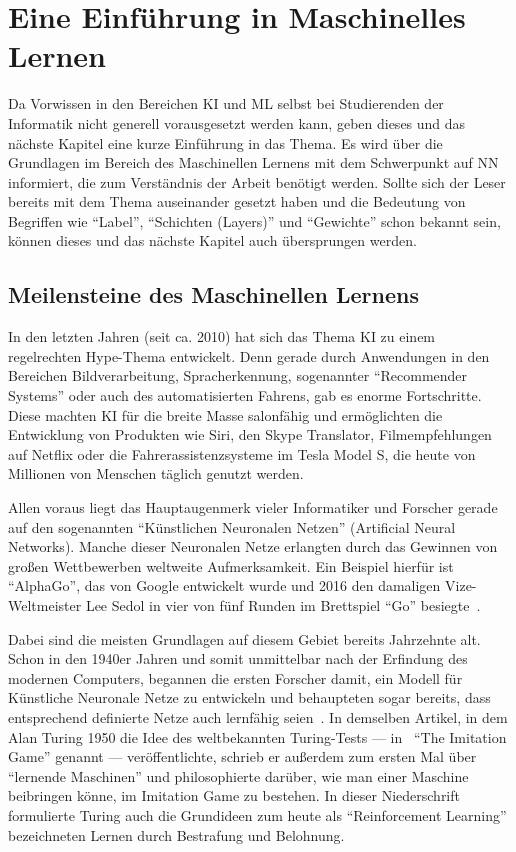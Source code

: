 \chapter{Eine Einführung in Maschinelles Lernen}
Da Vorwissen in den Bereichen \gls{KI} und \gls{ML} selbst bei Studierenden der Informatik nicht generell vorausgesetzt werden kann, geben dieses und das nächste Kapitel eine kurze Einführung in das Thema. Es wird über die Grundlagen im Bereich des Maschinellen Lernens mit dem Schwerpunkt auf \gls{NN} informiert, die zum Verständnis der Arbeit benötigt werden. Sollte sich der Leser bereits mit dem Thema auseinander gesetzt haben und die Bedeutung von Begriffen wie "`\gls{Label}"', "`Schichten (Layers)"' und "`Gewichte"' schon bekannt sein, können dieses und das nächste Kapitel auch übersprungen werden.

\section{Meilensteine des Maschinellen Lernens} \label{sec:milestones}
In den letzten Jahren (seit ca. 2010) hat sich das Thema \gls{KI} zu einem regelrechten Hype-Thema entwickelt. Denn gerade durch Anwendungen in den Bereichen Bildverarbeitung, Spracherkennung, sogenannter "`Recommender Systems"' oder auch des automatisierten Fahrens, gab es enorme Fortschritte. Diese machten \gls{KI} für die breite Masse salonfähig und ermöglichten die Entwicklung von Produkten wie Siri, den Skype Translator, Filmempfehlungen auf Netflix oder die Fahrerassistenzsysteme im Tesla Model S, die heute von Millionen von Menschen täglich genutzt werden.

Allen voraus liegt das Hauptaugenmerk vieler Informatiker und Forscher gerade auf den sogenannten "`Künstlichen Neuronalen Netzen"' (Artificial Neural Networks). Manche dieser Neuronalen Netze erlangten durch das Gewinnen von großen Wettbewerben weltweite Aufmerksamkeit. Ein Beispiel hierfür ist "`AlphaGo"', das von Google entwickelt wurde und 2016 den damaligen Vize-Weltmeister Lee Sedol in vier von fünf Runden im Brettspiel "`Go"' besiegte~\cite{alphaGo}.

Dabei sind die meisten Grundlagen auf diesem Gebiet bereits Jahrzehnte alt. Schon in den 1940er Jahren und somit unmittelbar nach der Erfindung des modernen Computers, begannen die ersten Forscher damit, ein Modell für Künstliche Neuronale Netze zu entwickeln und behaupteten sogar bereits, dass entsprechend definierte Netze auch lernfähig seien~\cite{Russell.2012}. In demselben Artikel, in dem Alan Turing 1950 die Idee des weltbekannten Turing-Tests --- in~\cite{TURING.1950} "`The Imitation Game"' genannt --- veröffentlichte, schrieb er außerdem zum ersten Mal über "`lernende Maschinen"' und philosophierte darüber, wie man einer Maschine beibringen könne, im Imitation Game zu bestehen. In dieser Niederschrift formulierte Turing auch die Grundideen zum heute als "`Reinforcement Learning"' bezeichneten Lernen durch Bestrafung und Belohnung.

